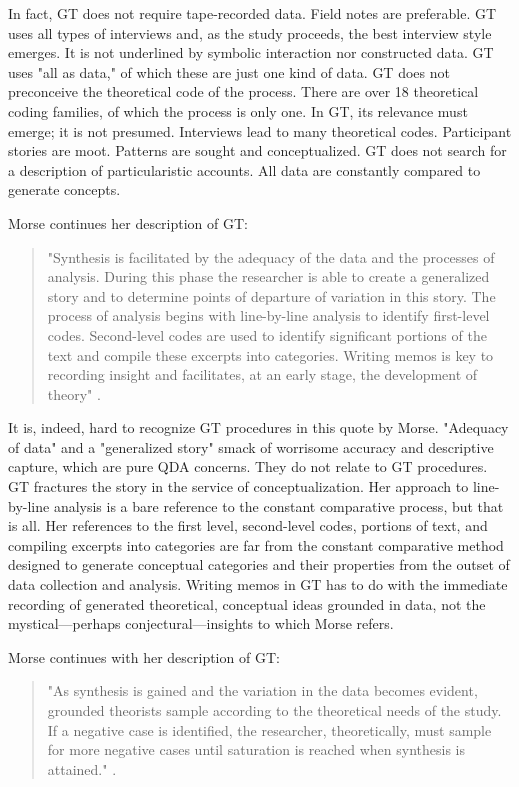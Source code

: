 In fact, GT does not require tape-recorded data. 
Field notes are preferable. 
GT uses all types of interviews and, as the study proceeds, the best interview style emerges. 
It is not underlined by symbolic interaction nor constructed data. 
GT uses "all as data," of which these are just one kind of data. 
GT does not preconceive the theoretical code of the process. 
There are over 18 theoretical coding families, of which the process is only one. 
In GT, its relevance must emerge; it is not presumed. 
Interviews lead to many theoretical codes. 
Participant stories are moot. 
Patterns are sought and conceptualized. 
GT does not search for a description of particularistic accounts. 
All data are constantly compared to generate concepts.

Morse continues her description of GT:

\begin{quote}
"Synthesis is facilitated by the adequacy of the data and the processes of
analysis. 
During this phase the researcher is able to create a generalized story and to determine points of departure of variation in this story. 
The process of analysis begins with line-by-line analysis to identify first-level codes. 
Second-level codes are used to identify significant portions of the text and compile these excerpts into categories. 
Writing memos is key to recording insight and facilitates, at an early stage, the development of theory"
\citep[p. 39]{incollection.morse94}.
\end{quote}

It is, indeed, hard to recognize GT procedures in this quote by Morse.
"Adequacy of data" and a "generalized story" smack of worrisome accuracy and descriptive capture, 
which are pure QDA concerns. 
They do not relate to GT procedures. 
GT fractures the story in the service of conceptualization. 
Her approach to line-by-line analysis is a bare reference to the constant comparative process, but that is all. 
Her references to the first level, second-level codes, portions of text, and compiling excerpts into categories are far from the constant comparative method designed to generate conceptual categories and their properties from the outset of data collection and analysis.
Writing memos in GT has to do with the immediate recording of generated theoretical, conceptual ideas grounded in data, not the mystical—perhaps conjectural—insights to which Morse refers.

Morse continues with her description of GT:
\begin{quote}
"As synthesis is gained and the variation in the data becomes evident,
grounded theorists sample according to the theoretical needs of the
study. 
If a negative case is identified, the researcher, theoretically, must
sample for more negative cases until saturation is reached when
synthesis is attained."
\citep[p. 39]{incollection.morse94}.
\end{quote}

